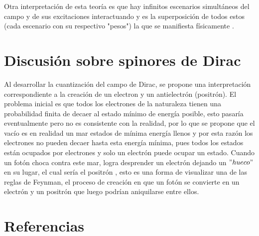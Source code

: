\documentclass{article}
\begin{document}
Otra interpretación de esta teoría es que hay infinitos escenarios simultáneos del campo y de sus excitaciones interactuando  y es la superposición de todos estos (cada escenario con su respectivo "pesos")  la que se manifiesta físicamente \cite{Roussel:2020}.

\section{Discusión sobre spinores de Dirac}
Al desarrollar la cuantización del campo de Dirac, se propone una interpretación correspondiente a la creación de un electron y un antielectrón (positrón). El problema inicial es que todos los electrones de la naturaleza tienen una probabilidad finita de decaer al estado mínimo de energía posible, esto pasaría eventualmente pero no es consistente con la realidad, por lo que se propone que el vacío es en realidad un mar estados de mínima energía llenos y por esta razón los electrones no pueden decaer hasta esta energía mínima, pues todos los estados están ocupados por electrones y solo un electrón puede ocupar un estado. Cuando un fotón choca contra este mar, logra desprender un electrón dejando un $"hueco"$ en su lugar, el cual sería el positrón \cite{Kaku:1993}, esto es una forma de visualizar una de las reglas de Feynman, el proceso de creación en que un fotón se convierte en un electrón y un positrón \cite{Restrepo:2020} que luego podrían aniquilarse entre ellos.

\section{Referencias}



\end{document}
